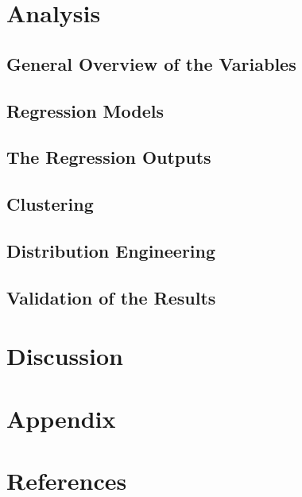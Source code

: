 \documentclass[12pt]{article}
\numberwithin{equation}{section}
\numberwithin{table}{section}
\numberwithin{figure}{section}
\begin{document}
\section{Analysis}

\subsection{General Overview of the Variables} \label{Overview variables}

\subsection{Regression Models} \label{Regression Models}

\subsection{The Regression Outputs} \label{Regression Outputs}

\subsection{Clustering} \label{Clustering}

\subsection{Distribution Engineering} \label{Distribution Engineering}

\subsection{Validation of the Results} \label{Results}

\clearpage
\section{Discussion} 

\clearpage



\section*{Appendix} \label{Appendix}


\clearpage

\section*{References}

%
\end{document}

